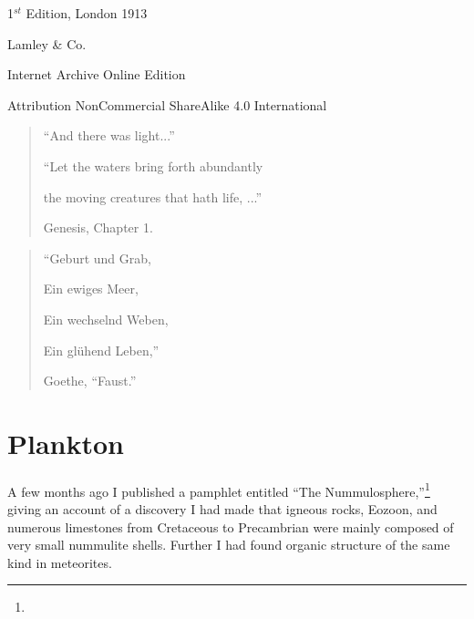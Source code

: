 \documentclass[a4paper, 12pt, oneside]{article}
\begin{document}
\begin{titlepage}
	
		
	\vspace*{\fill}%
	
	1$^{st}$ Edition, London 1913 %
	
	{\small Lamley \& Co. } %

	\vspace{1\baselineskip} %

    Internet Archive Online Edition  %
	
	{\small Attribution NonCommercial ShareAlike 4.0 International } %
\end{titlepage}
\pagestyle{fancy}
\fancyhf{}
\cfoot{\Fontauri{\thepage}}
\Large
\vspace*{\fill}
\begin{quote} 
``And there was light...''

``Let the waters bring forth abundantly

the moving creatures that hath life, ...''

Genesis, Chapter 1. 
\end{quote}
\vspace{2\baselineskip}
\begin{quote} 
``Geburt und Grab,

Ein ewiges Meer,

Ein wechselnd Weben,

Ein glühend Leben,''

Goethe, ``Faust.''
\end{quote}
\vspace*{\fill}
\clearpage
\setlength{\parskip}{1mm plus1mm minus1mm}
\setcounter{tocdepth}{3}
\setcounter{secnumdepth}{3}
\tableofcontents
\clearpage
\section{Plankton}
\paragraph{}
A few months ago I published a pamphlet entitled ``The Nummulosphere,''\footnote{} giving an account of a discovery I had made that igneous rocks, Eozoon, and numerous limestones from Cretaceous to Precambrian were mainly composed of very small nummulite shells. Further I had found organic structure of the same kind in meteorites.
\end{document}
